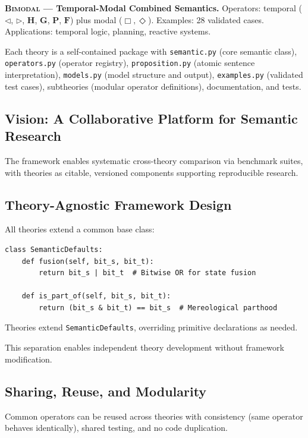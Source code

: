 \documentclass[pdflatex,sn-mathphys-num]{sn-jnl}
\newcommand{\nec}{\Box}                     %
\newcommand{\poss}{\Diamond}                %
\newcommand{\allpast}{\mathbf{H}}           %
\newcommand{\allfuture}{\mathbf{G}}         %
\newcommand{\somepast}{\mathbf{P}}          %
\newcommand{\somefuture}{\mathbf{F}}        %
\newcommand{\since}{\triangleleft}          %
\newcommand{\until}{\triangleright}         %
\newcommand{\theorybimodal}{\textsc{Bimodal}}
\theoremstyle{thmstyleone}
\theoremstyle{thmstyletwo}
\theoremstyle{thmstylethree}
\begin{document}
\textbf{\theorybimodal{} --- Temporal-Modal Combined Semantics.}
Operators: temporal ($\since$, $\until$, $\allpast$, $\allfuture$, $\somepast$, $\somefuture$) plus modal ($\nec, \poss$).
Examples: 28 validated cases.
Applications: temporal logic, planning, reactive systems.

Each theory is a self-contained package with \texttt{semantic.py} (core semantic class), \texttt{operators.py} (operator registry), \texttt{proposition.py} (atomic sentence interpretation), \texttt{models.py} (model structure and output), \texttt{examples.py} (validated test cases), subtheories (modular operator definitions), documentation, and tests.

\subsection{Vision: A Collaborative Platform for Semantic Research}\label{sec:vision}

The framework enables systematic cross-theory comparison via benchmark suites, with theories as citable, versioned components supporting reproducible research.

\subsection{Theory-Agnostic Framework Design}\label{sec:agnostic-design}

All theories extend a common base class:
\begin{lstlisting}[caption={The semantic interface}]
class SemanticDefaults:
    def fusion(self, bit_s, bit_t):
        return bit_s | bit_t  # Bitwise OR for state fusion

    def is_part_of(self, bit_s, bit_t):
        return (bit_s & bit_t) == bit_s  # Mereological parthood
\end{lstlisting}

Theories extend \texttt{SemanticDefaults}, overriding primitive declarations as needed.

This separation enables independent theory development without framework modification.

\subsection{Sharing, Reuse, and Modularity}\label{sec:sharing}

Common operators can be reused across theories with consistency (same operator behaves identically), shared testing, and no code duplication.
\end{document}
